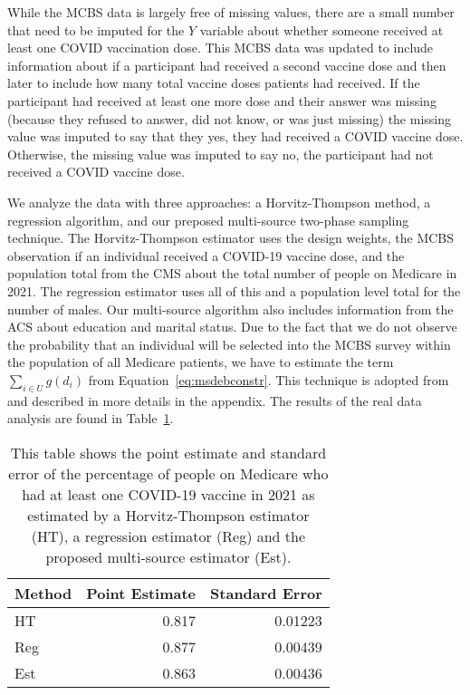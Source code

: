 \documentclass[12pt]{article}
\begin{document}
While the MCBS data is largely free of missing values, there are a small number
that need to be imputed for the $Y$ variable about whether someone received at
least one COVID vaccination dose. This MCBS data was updated to include
information about if a participant had received a second vaccine dose and then
later to include how many total vaccine doses patients had received. If the
participant had received at least one more dose and their answer was missing (because
they refused to answer, did not know, or was just missing) the missing value was
imputed to say that they yes, they had received a COVID vaccine dose. Otherwise,
the missing value was imputed to say no, the participant had not received a
COVID vaccine dose.

We analyze the data with three approaches: a Horvitz-Thompson method, a
regression algorithm, and our preposed multi-source two-phase sampling technique. 
The Horvitz-Thompson estimator uses the design weights, the MCBS observation if
an individual received a COVID-19 vaccine dose, and the population total from
the CMS about the total number of people on Medicare in 2021. The regression
estimator uses all of this and a population level total for the number of males.
Our multi-source algorithm also includes information from the ACS about
education and marital status. Due to the fact that we do not observe the
probability that an individual will be selected into the MCBS survey within the
population of all Medicare patients, we have to estimate the term 
$\sum_{i \in U} g(d_i)$ from Equation~\ref{eq:msdebconstr}. This technique is
adopted from \cite{kwon2024debiased} and described in more details in the
appendix.
The results of the real data analysis are found in Table~\ref{tab:mcbsres}.

\begin{table}[ht!]
  \centering
  \label{tab:mcbsres}
  \begin{tabular}{lrr}
    \toprule
    Method & Point Estimate & Standard Error \\
    \midrule
    HT  & 0.817 & 0.01223 \\
    Reg & 0.877 & 0.00439 \\
    Est & 0.863 & 0.00436 \\ 
    \bottomrule
  \end{tabular}
  \caption{This table shows the point estimate and standard error of the
  percentage of people on Medicare who had at least one COVID-19 vaccine in
  2021 as estimated by a Horvitz-Thompson estimator (HT), a regression estimator
  (Reg) and the proposed multi-source estimator (Est).}
\end{table}
\end{document}
